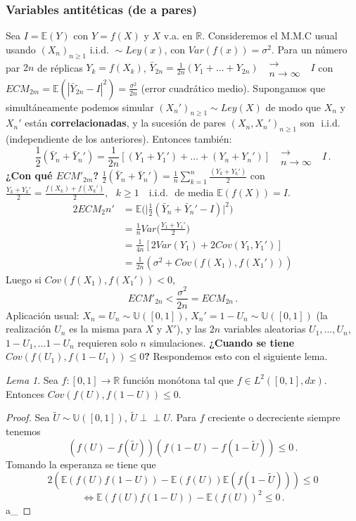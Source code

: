 \documentclass[letterpaper,11pt]{article} %
\theoremstyle{defbreak}
\theoremstyle{propbreak}
\theoremstyle{remark}
\theoremstyle{break}
\newtheorem{lemma}{Lema}[subsection]
\def\R{\mathbb{R}}
\def\E{\mathbb{E}}
\def\unif{\mathbb{U}([0,1])}
\def\var{Var}
\def\cov{Cov}
\newcommand{\indep}{\perp \!\!\! \perp}
\def\conv{\mbox{ }\substack{\longrightarrow \\ n\to\infty}\mbox{ }}
\def\iid{\mbox{ i.i.d. }}
\def\gris{\color{mygray}}
\def\negro{\color{black}}
\def\findem{\null\hfill\color{white}a\color{black}_\square}
\begin{document}
\subsubsection{Variables antitéticas (de a pares)}
\label{antitéticas}
Sea $I=\E(Y)$ con \hspace{.2cm} $Y=f(X)$ y \hspace{.2cm} $X$ v.a. en $\R$. Consideremos el M.M.C usual usando $(X_n)_{n\geq1}\iid \sim Ley(x)$, con $\var(f(x))=\sigma^2$. Para un número par $2n$ de réplicas $Y_k=f(X_k)$, $\bar{Y}_{2n}=\frac{1}{2n}(Y_1+\dots+Y_{2n})\conv I$ con $ECM_{2m}=\E(|\bar{Y}_{2n}-I|^2)=\displaystyle\frac{\sigma^2}{2n}$ (error cuadrático medio).
\newp Supongamos que simultáneamente podemos simular $(X_n')_{n\geq 1}\sim Ley(X)$ de modo que $X_n$ y $X_n'$ están \textbf{correlacionadas}, y la sucesión de pares $(X_n,X_n')_{n\geq1}$ son $\iid$ (independiente de los anteriores). Entonces también:
$$ \displaystyle\frac{1}{2}(\bar{Y}_n+\bar{Y}_n')=\frac{1}{2n}[(Y_1+Y_1')+\dots+(Y_n+Y_n')]\conv I\, .$$
\textbf{¿Con qué $ECM'_{2m}$?}
\newline $\displaystyle\frac{1}{2}(\bar{Y}_n+\bar{Y}_n')=\frac{1}{n}\sum^n_{k=1}\frac{(Y_k+Y_k')}{2}$ con $\frac{Y_k+Y_k'}{2}=\frac{f(X_k)+f(X_k')}{2},\mbox{ } k\geq1\mbox{ }\iid$ de media $\E(f(X))=I$.
\begin{alignat*}{2}
ECM_2n' & = \E\bigg(\bigg|\frac{1}{2}(\bar{Y}_n+\bar{Y}_n'-I)\bigg|^2\bigg) \\
& =\frac{1}{n}\var\bigg(\frac{Y_1+Y_1'}{2}\bigg) \\
& =\frac{1}{4n}[2\var(Y_1)+2\cov(Y_1,Y_1')] \\
& =\frac{1}{2n}(\sigma^2+\cov(f(X_1),f(X_1')))
\end{alignat*}
Luego si $\cov(f(X_1),f(X_1'))<0$, $$ECM'_{2n}<\frac{\sigma^2}{2n}=ECM_{2n} \, .$$
Aplicación usual: $X_n=U_n\sim\unif$, $X_n'=1-U_n\sim\unif$ (la realización $U_n$ es la misma para $X$ y $X'$), y las $2n$ variables aleatorias $U_1,\dots,U_n$, $1-U_1,\dots1-U_n$ requieren solo $n$ simulaciones.
\newp \textbf{¿Cuando se tiene $\cov(f(U_1),f(1-U_1))\leq 0$?}
Respondemos esto con el siguiente lema.
\begin{lemma}
Sea $f:[0,1]\to\R$ función monótona tal que $f\in L^2([0,1],dx)$. Entonces $\cov(f(U),f(1-U))\leq0$.
\end{lemma}
\begin{proof}  %
\gris
Sea $\tilde{U}\sim \unif$, $\tilde{U}\indep U$. Para $f$ creciente o decreciente siempre tenemos
$$ (f(U)-f(\tilde{U}))(f(1-U)-f(1-\tilde{U})) \leq 0 \, .$$
Tomando la esperanza se tiene que
$$ 2(\E(f(U)f(1-U))-\E(f(U))\E(f(1-\tilde{U})))\leq 0 $$
$$ \Longleftrightarrow \E(f(U)f(1-U))-\E(f(U))^2 \leq 0 \, .$$
\findem
\negro
\end{proof}
\end{document}
